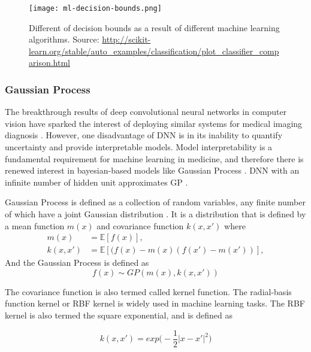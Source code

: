 \begin{figure}[h]
\texttt{[image: ml-decision-bounds.png]}
\caption{Different of decision bounds as a result of different machine learning algorithms. Source: \protect\url{http://scikit-learn.org/stable/auto_examples/classification/plot_classifier_comparison.html} }\label{fig:ml-bounds}
 \end{figure}

\subsubsection{Gaussian Process}
The breakthrough results of deep convolutional neural networks in computer vision \cite{Krizhevsky2012} have sparked the interest of deploying similar systems for medical imaging diagnosis \cite{Greenspan2016}. However, one disadvantage of DNN is in its inability to quantify uncertainty and provide interpretable models. Model interpretability is a fundamental requirement for machine learning in medicine, and therefore there is renewed interest in bayesian-based models like Gaussian Process \cite{gal2016dropout}. DNN with an infinite number of hidden unit approximates GP \cite{neal1996priors}. 

Gaussian Process is defined as a collection of random variables, any finite number of which have a joint Gaussian distribution \cite{rasmussen2006gaussian}. 
It is a distribution that is defined by a mean function $m(x)$ and covariance function $k(x,x') $ where
\begin{equation}
	\begin{split}
		m(x) &= \mathbb{E}[f(x)], \\
		k(x,x') &= \mathbb{E}[(f(x)-m(x)(f(x')-m(x'))],
	\end{split}
\end{equation}
And the Gaussian Process is defined as
\begin{equation}
f(x) \sim GP(m(x), k(x, x')) 
\end{equation}

The covariance function is also termed called kernel function. The radial-basis function kernel or RBF kernel is widely used in machine learning tasks. The RBF kernel is also termed the square exponential, and is defined as

\begin{equation}
k(x, x') = exp\bigg( -\frac{1}{2}|x - x'|^2\bigg)
\end{equation} 

